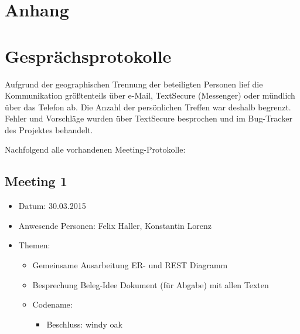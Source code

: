 \documentclass[12pt]{scrartcl}
\begin{document}
	\newpage	
	\appendix
	\setcounter{page}{1}
	\section*{Anhang}
	\section{Gesprächsprotokolle}
		Aufgrund der geographischen Trennung der beteiligten Personen lief die Kommunikation größtenteils über e-Mail, TextSecure (Messenger) oder mündlich über das Telefon ab. Die Anzahl der persönlichen Treffen war deshalb begrenzt. Fehler und Vorschläge wurden über TextSecure besprochen und im Bug-Tracker des Projektes behandelt.
		
		Nachfolgend alle vorhandenen Meeting-Protokolle:
		\subsection{Meeting 1}
			\begin{itemize}
				\item Datum: 30.03.2015
				\item Anwesende Personen: Felix Haller, Konstantin Lorenz
				\item Themen:
				\begin{itemize}
					\item Gemeinsame Ausarbeitung ER- und REST Diagramm
					\item Besprechung Beleg-Idee Dokument (für Abgabe) mit allen Texten
					\item Codename:
					\begin{itemize}
						\item Beschluss: windy oak
					\end{itemize}
				\end{itemize}
			\end{itemize}
		
\end{document}
